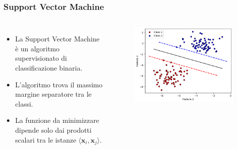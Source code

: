 \documentclass{beamer}
\begin{document}
\begin{frame}

  \frametitle{Support Vector Machine}
  
    \begin{columns}
    
      \begin{itemize}
        \item<1-> La Support Vector Machine è un algoritmo supervisionato di classificazione binaria. 
            \item<2-> L'algoritmo trova il massimo margine separatore tra le classi. 
            \item<3-> La funzione da minimizzare dipende solo dai prodotti scalari tra le istanze $\langle \mathbf{x}_i, \mathbf{x}_j \rangle$. 
            \end{itemize}
      
      \begin{figure}
            \includegraphics[width=1.2\textwidth]{images/classicalsvm.png}
       \end{figure}
      
      \end{columns}
  
  \end{frame}
\end{document}
